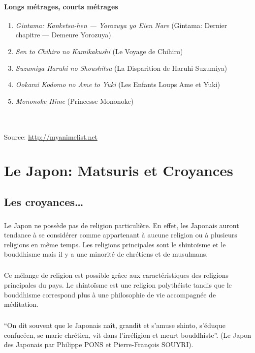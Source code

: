 \subsubsection{Longs métrages, courts métrages}

\begin{enumerate}
	\item \emph{Gintama: Kanketsu-hen --- Yorozuya yo Eien Nare} (Gintama: Dernier chapitre --- Demeure Yorozuya)
	\item \emph{Sen to Chihiro no Kamikakushi} (Le Voyage de Chihiro)
	\item \emph{Suzumiya Haruhi no Shoushitsu} (La Disparition de Haruhi Suzumiya)
	\item \emph{Ookami Kodomo no Ame to Yuki} (Les Enfants Loups Ame et Yuki)
	\item \emph{Mononoke Hime} (Princesse Mononoke)
\end{enumerate}
~\\~\\
\noindent
Source: \url{http://myanimelist.net}

\chapter[Matsuris et Croyances]{Le Japon: Matsuris et Croyances}

\section{Les croyances\ldots}

\paragraph{} Le Japon ne possède pas de religion particulière. En effet, les
Japonais auront tendance à se considérer comme appartenant à aucune religion ou
à plusieurs religions en même temps. Les religions principales sont le
shintoïsme et le bouddhisme mais il y a une minorité de chrétiens et de
musulmans.

\paragraph{} Ce mélange de religion est possible grâce aux caractéristiques des
religions principales du pays. Le shintoïsme est une religion polythéiste
tandis que le bouddhisme correspond plus à une philosophie de vie accompagnée
de méditation.

\paragraph{} ``On dit souvent que le Japonais naît, grandit et s'amuse shinto,
s'éduque confucéen, se marie chrétien, vit dans l'irréligion et meurt
bouddhiste''. (Le Japon des Japonais par Philippe PONS et Pierre-François
SOUYRI).

